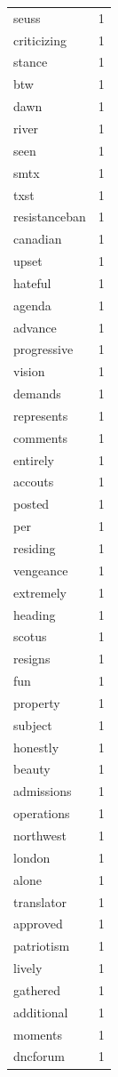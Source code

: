 \begin{tabular}{lr}
seuss & 1 \\
criticizing & 1 \\
stance & 1 \\
btw & 1 \\
dawn & 1 \\
river & 1 \\
seen & 1 \\
smtx & 1 \\
txst & 1 \\
resistanceban & 1 \\
canadian & 1 \\
upset & 1 \\
hateful & 1 \\
agenda & 1 \\
advance & 1 \\
progressive & 1 \\
vision & 1 \\
demands & 1 \\
represents & 1 \\
comments & 1 \\
entirely & 1 \\
accouts & 1 \\
posted & 1 \\
per & 1 \\
residing & 1 \\
vengeance & 1 \\
extremely & 1 \\
heading & 1 \\
scotus & 1 \\
resigns & 1 \\
fun & 1 \\
property & 1 \\
subject & 1 \\
honestly & 1 \\
beauty & 1 \\
admissions & 1 \\
operations & 1 \\
northwest & 1 \\
london & 1 \\
alone & 1 \\
translator & 1 \\
approved & 1 \\
patriotism & 1 \\
lively & 1 \\
gathered & 1 \\
additional & 1 \\
moments & 1 \\
dncforum & 1 \\

\end{tabular}
